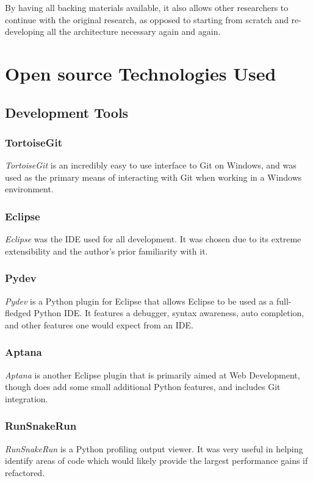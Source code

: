 \documentclass[a4paper,11pt]{report}
\begin{document}
By having all backing materials available, it also allows other researchers to continue with the original research, as opposed to starting from scratch and re-developing all the architecture necessary again and again.

\section{Open source Technologies Used}
\subsection{Development Tools}
\subsubsection*{TortoiseGit}
\emph{TortoiseGit} \citep{prog:tortoisegit} is an incredibly easy to use interface to Git on Windows, and was used as the primary means of interacting with Git when working in a Windows environment.

\subsubsection*{Eclipse}
\emph{Eclipse} \citep{prog:eclipse} was the IDE used for all development. It was chosen due to its extreme extensibility and the author's prior familiarity with it.

\subsubsection*{Pydev}
\emph{Pydev} \citep{prog:pydev} is a Python plugin for Eclipse that allows Eclipse to be used as a full-fledged Python IDE. It features a debugger, syntax awareness, auto completion, and other features one would expect from an IDE.

\subsubsection*{Aptana}
\emph{Aptana} \citep{prog:aptana} is another Eclipse plugin that is primarily aimed at Web Development, though does add some small additional Python features, and includes Git integration.

\subsubsection*{RunSnakeRun}
\emph{RunSnakeRun} \citep{prog:runsnakerun} is a Python profiling output viewer. It was very useful in helping identify areas of code which would likely provide the largest performance gains if refactored.
\end{document}
